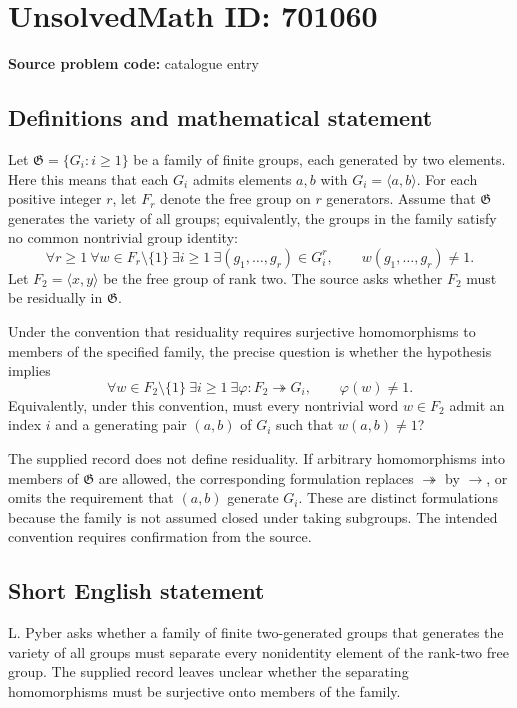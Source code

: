 \documentclass[11pt]{article}
\begin{document}
\section*{UnsolvedMath ID: 701060}
\textbf{Source problem code:} catalogue entry
\subsection{Definitions and mathematical statement}
Let \(\mathfrak G=\{G_i:i\geq 1\}\) be a family of finite groups, each generated by two elements. Here this means that each \(G_i\) admits elements \(a,b\) with \(G_i=\langle a,b\rangle\). For each positive integer \(r\), let \(F_r\) denote the free group on \(r\) generators. Assume that \(\mathfrak G\) generates the variety of all groups; equivalently, the groups in the family satisfy no common nontrivial group identity:
\[
\forall r\geq 1\ \forall w\in F_r\setminus\{1\}\ \exists i\geq 1\ \exists(g_1,\ldots,g_r)\in G_i^r,
\qquad w(g_1,\ldots,g_r)\neq 1.
\]
Let \(F_2=\langle x,y\rangle\) be the free group of rank two. The source asks whether \(F_2\) must be residually in \(\mathfrak G\).

Under the convention that residuality requires surjective homomorphisms to members of the specified family, the precise question is whether the hypothesis implies
\[
\forall w\in F_2\setminus\{1\}\ \exists i\geq 1\ \exists\varphi:F_2\twoheadrightarrow G_i,
\qquad \varphi(w)\neq 1.
\]
Equivalently, under this convention, must every nontrivial word \(w\in F_2\) admit an index \(i\) and a generating pair \((a,b)\) of \(G_i\) such that \(w(a,b)\neq 1\)?

The supplied record does not define residuality. If arbitrary homomorphisms into members of \(\mathfrak G\) are allowed, the corresponding formulation replaces \(\twoheadrightarrow\) by \(\to\), or omits the requirement that \((a,b)\) generate \(G_i\). These are distinct formulations because the family is not assumed closed under taking subgroups. The intended convention requires confirmation from the source.
\subsection{Short English statement}
L. Pyber asks whether a family of finite two-generated groups that generates the variety of all groups must separate every nonidentity element of the rank-two free group. The supplied record leaves unclear whether the separating homomorphisms must be surjective onto members of the family.
\end{document}
